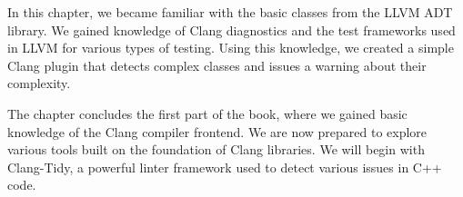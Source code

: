 In this chapter, we became familiar with the basic classes from the LLVM ADT library. We gained knowledge of Clang diagnostics and the test frameworks used in LLVM for various types of testing. Using this knowledge, we created a simple Clang plugin that detects complex classes and issues a warning about their complexity.

The chapter concludes the first part of the book, where we gained basic knowledge of the Clang compiler frontend. We are now prepared to explore various tools built on the foundation of Clang libraries. We will begin with Clang-Tidy, a powerful linter framework used to detect various issues in C++ code.
